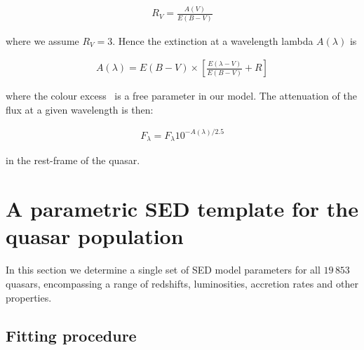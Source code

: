 \begingroup\makeatletter{}\check@mathfonts
\begin{eqnarray}
  R_V = \frac{A(V)}{E(B-V)}
\end{eqnarray}
\endgroup

\noindent where we assume $R_V = 3$. 
Hence the extinction at a wavelength lambda $A(\lambda)$ is 

\begingroup\makeatletter{}\check@mathfonts
\begin{eqnarray}
  A(\lambda) = E(B-V) \times \left[ \frac{E(\lambda-V)}{E(B-V)} + R \right] 
\end{eqnarray}
\endgroup

\noindent where the colour excess \ebv\, is a free parameter in our model. 
The attenuation of the flux at a given wavelength is then:

\begingroup\makeatletter{}\check@mathfonts
\begin{eqnarray}
  F_\lambda = F_\lambda10^{-A(\lambda)/2.5}
\end{eqnarray}
\endgroup

\noindent in the rest-frame of the quasar. 

\section{A parametric SED template for the quasar population} 
\label{sec:ch5-standardmodel}

In this section we determine a single set of SED model parameters for all $19\,853$ quasars, encompassing a range of redshifts, luminosities, accretion rates and other properties. 

\subsection{Fitting procedure}

